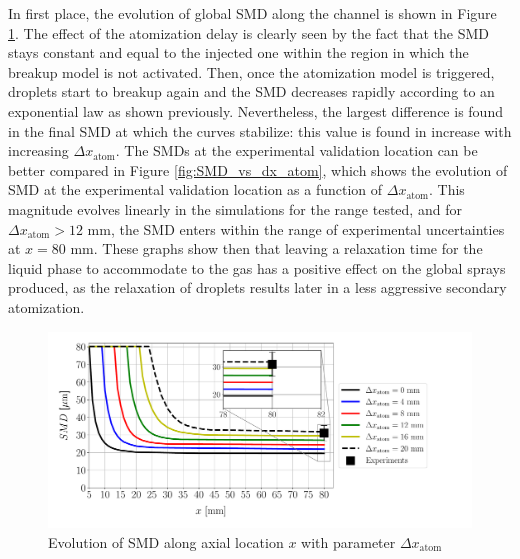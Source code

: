 In first place, the evolution of global SMD along the channel is shown in Figure \ref{fig:SMD_vs_x_param_dx_atom}. The effect of the atomization delay is clearly seen by the fact that the SMD stays constant and equal to the injected one within the region in which the breakup model is not activated. Then, once the atomization model is triggered, droplets start to breakup again and the SMD decreases rapidly according to an exponential law as shown previously. Nevertheless, the largest difference is found in the final SMD at which the curves stabilize: this value is found in increase with increasing $\Delta x_\mathrm{atom}$.  The SMDs at the experimental validation location can be better compared in Figure \ref{fig:SMD_vs_dx_atom}, which shows the evolution of SMD at the experimental validation location as a function of $\Delta x_\mathrm{atom}$. This magnitude evolves linearly in the simulations for the range tested, and for $\Delta x_\mathrm{atom} > 12$ mm, the SMD enters within the range of experimental uncertainties at $x = 80$ mm. These graphs show then that leaving a relaxation time for the liquid phase to accommodate to the gas has a positive effect on the global sprays produced, as the relaxation of droplets results later in a less aggressive secondary atomization.



\begin{figure}[h!]
\centering
\includegraphics[scale=0.5]{./part2_developments/figures_ch6_lagrangian_JICF/params_dx_atom/SMD_vs_x_dx_atom_comparison}
\caption{Evolution of SMD along axial location $x$ with parameter $\Delta x_\mathrm{atom}$}
\label{fig:SMD_vs_x_param_dx_atom}
\end{figure}

